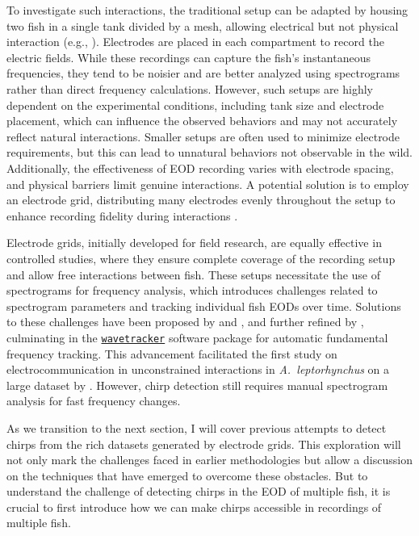 To investigate such interactions, the traditional setup can be adapted by
housing two fish in a single tank divided by a mesh, allowing electrical but
not physical interaction (e.g., \cite{obotiWhyBrownGhost2023}). Electrodes are
placed in each compartment to record the electric fields. While these
recordings can capture the fish's instantaneous frequencies, they tend to be
noisier and are better analyzed using spectrograms rather than direct frequency
calculations. However, such setups are highly dependent on the experimental
conditions, including tank size and electrode placement, which can influence
the observed behaviors and may not accurately reflect natural interactions.
Smaller setups are often used to minimize electrode requirements, but this can
lead to unnatural behaviors not observable in the wild. Additionally, the
effectiveness of EOD recording varies with electrode spacing, and physical
barriers limit genuine interactions. A potential solution is to employ an
electrode grid, distributing many electrodes evenly throughout the setup to
enhance recording fidelity during interactions
\parencite{junLongtermBehavioralTracking2014, pedrajaUseSupervisedLearning2021,
henningerTrackingActivityPatterns2020,
madhavHighresolutionBehavioralMapping2018}.

Electrode grids, initially developed for field research, are equally effective
in controlled studies, where they ensure complete coverage of the recording
setup and allow free interactions between fish. These setups necessitate the
use of spectrograms for frequency analysis, which introduces challenges related
to spectrogram parameters and tracking individual fish EODs over time.
Solutions to these challenges have been proposed by
\textcite{henningerTrackingActivityPatterns2020} and
\textcite{madhavHighresolutionBehavioralMapping2018}, and further refined by
\textcite{raabAdvancesNoninvasiveTracking2022}, culminating in the
\href{https://github.com/tillraab/wavetracker}{\texttt{wavetracker}} software
package for automatic fundamental frequency tracking. This advancement
facilitated the first study on electrocommunication in unconstrained
interactions in \textit{A.~leptorhynchus} on a large dataset by
\textcite{raabElectrocommunicationSignalsIndicate2021}. However, chirp
detection still requires manual spectrogram analysis for fast frequency
changes.

As we transition to the next section, I will cover previous attempts to detect
chirps from the rich datasets generated by electrode grids. This exploration
will not only mark the challenges faced in earlier methodologies but allow a
discussion on the techniques that have emerged to overcome these obstacles. But
to understand the challenge of detecting chirps in the EOD of multiple fish, it
is crucial to first introduce how we can make chirps accessible in recordings
of multiple fish.

